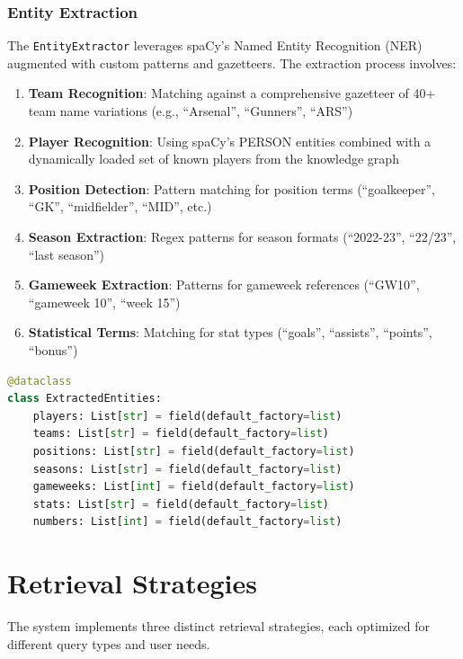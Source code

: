 \documentclass[11pt, a4paper]{article}
\begin{document}
\subsubsection{Entity Extraction}
The \texttt{EntityExtractor} leverages spaCy's Named Entity Recognition (NER) augmented with custom patterns and gazetteers. The extraction process involves:

\begin{enumerate}
    \item \textbf{Team Recognition}: Matching against a comprehensive gazetteer of 40+ team name variations (e.g., ``Arsenal'', ``Gunners'', ``ARS'')
    \item \textbf{Player Recognition}: Using spaCy's PERSON entities combined with a dynamically loaded set of known players from the knowledge graph
    \item \textbf{Position Detection}: Pattern matching for position terms (``goalkeeper'', ``GK'', ``midfielder'', ``MID'', etc.)
    \item \textbf{Season Extraction}: Regex patterns for season formats (``2022-23'', ``22/23'', ``last season'')
    \item \textbf{Gameweek Extraction}: Patterns for gameweek references (``GW10'', ``gameweek 10'', ``week 15'')
    \item \textbf{Statistical Terms}: Matching for stat types (``goals'', ``assists'', ``points'', ``bonus'')
\end{enumerate}

\begin{lstlisting}[language=Python, caption={Entity Extraction Data Class}]
@dataclass
class ExtractedEntities:
    players: List[str] = field(default_factory=list)
    teams: List[str] = field(default_factory=list)
    positions: List[str] = field(default_factory=list)
    seasons: List[str] = field(default_factory=list)
    gameweeks: List[int] = field(default_factory=list)
    stats: List[str] = field(default_factory=list)
    numbers: List[int] = field(default_factory=list)
\end{lstlisting}

\section{Retrieval Strategies}
\label{sec:retrieval}

The system implements three distinct retrieval strategies, each optimized for different query types and user needs.
\end{document}
